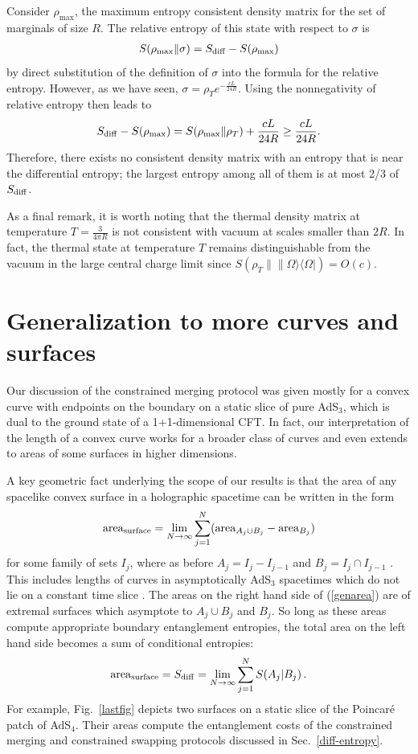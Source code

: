 \documentclass[12pt]{article}
\newcommand{\la}{\langle}
\newcommand{\ra}{\rangle}
\def\bea{\begin{eqnarray}}
\def\eea{\end{eqnarray}}
\def\sdiff{S_{\rm diff}}
\begin{document}
Consider $\rho_{\max}$, the maximum entropy consistent density matrix for the set of marginals of size $R$. The relative entropy of this state with respect to $\sigma$ is
\bea
S(\rho_{\max}\|\sigma)=\sdiff-S(\rho_{\max})
\eea
by direct substitution of the definition of $\sigma$ into the formula for the relative entropy.
However, as we have seen, $\sigma=\rho_T e^{-\frac{c L}{24 R}}$. Using the nonnegativity of relative entropy then leads to
\bea
\sdiff-S(\rho_{\max})=S(\rho_{\max}\|\rho_T)+\frac{c L}{24 R}\geq \frac{c L}{24 R}.
\eea
Therefore, there exists no consistent density matrix with an entropy that is near the differential entropy; the largest entropy among all of them is at most 2/3 of $\sdiff$.

As a final remark, it is worth noting that the thermal density matrix at temperature $T=\frac{3}{4\pi R}$ is not consistent with vacuum at scales smaller than $2R$. In fact, the thermal state at temperature $T$ remains distinguishable from the vacuum in the large central charge limit since $S(\rho_T\|\|\Omega\ra\la\Omega|)=O(c)$.

\section{Generalization to more curves and surfaces}
\label{disc}
Our discussion of the constrained merging protocol was given mostly for a convex curve with endpoints on the boundary on a static slice of pure AdS$_3$, which is dual to the ground state of a 1+1-dimensional CFT. In fact, our interpretation of the length of a convex curve works for a broader class of curves and even extends to areas of some surfaces in higher dimensions.

A key geometric fact underlying the scope of our results is that the area of any spacelike convex surface in a holographic spacetime can be written in the form
\begin{equation}
{\rm area}_{\rm surface} =
\lim_{N \to \infty} \sum_{j = 1}^N ({\rm area}_{A_j\cup B_j} - {\rm area}_{B_j})
\label{genarea}
\end{equation}
for some family of sets $I_j$, where as before $A_j = I_j - I_{j-1}$ and $B_j = I_j \cap I_{j-1}$  \cite{xi, robproof}.
This includes lengths of curves in asymptotically AdS$_3$ spacetimes which do not lie on a constant time slice \cite{robproof}. The areas on the right hand side of (\ref{genarea}) are of extremal surfaces which asymptote to $A_j \cup B_j$ and $B_j$. So long as these areas compute appropriate boundary entanglement entropies, the total area on the left hand side becomes a sum of conditional entropies:
\begin{equation}
{\rm area}_{\rm surface} =
\sdiff = \lim_{N \to \infty} \sum_{j = 1}^N S(A_j | B_j)\, .\label{genform}
\end{equation}
For example, Fig.~\ref{lastfig} depicts two surfaces on a static slice of the Poincar{\'e} patch of AdS$_4$. Their areas compute the entanglement costs of the constrained merging and constrained swapping protocols discussed in Sec.~\ref{diff-entropy}.
\end{document}
